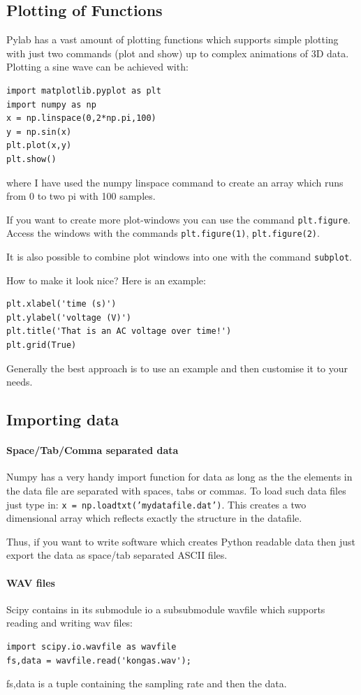 \documentclass[12pt,a4paper]{article}
\begin{document}
\subsection{Plotting of Functions}
Pylab has a vast amount of plotting functions which supports simple plotting
with just two commands (plot and show) up to complex animations of 3D data.
Plotting a sine wave can be achieved with:
\begin{verbatim} 
import matplotlib.pyplot as plt
import numpy as np
x = np.linspace(0,2*np.pi,100)
y = np.sin(x)
plt.plot(x,y)
plt.show()
\end{verbatim}
where I have used the numpy linspace command to create an array which
runs from 0 to two pi with 100 samples.

If you want to create more plot-windows you can use the command
\texttt{plt.figure}. Access the windows with the commands \texttt{plt.figure(1)},
\texttt{plt.figure(2)}.

It is also possible to combine plot windows into one with the
command \texttt{subplot}.

How to make it look nice? Here is an example:
\begin{verbatim}
plt.xlabel('time (s)')
plt.ylabel('voltage (V)')
plt.title('That is an AC voltage over time!')
plt.grid(True)
\end{verbatim}

Generally the best approach is to use an example and then customise it to your needs.




\subsection{Importing data}

\paragraph{Space/Tab/Comma separated data}
Numpy has a very handy import function for data as long as the the
elements in the data file are separated with spaces, tabs or
commas. To load such data files just type in: \texttt{x =
  np.loadtxt('mydatafile.dat')}. This creates a two dimensional array
which reflects exactly the structure in the datafile.

Thus, if you want to write software which creates Python
readable data then just export the data as space/tab separated ASCII files.



\paragraph{WAV files}
Scipy contains in its submodule io a subsubmodule wavfile which supports
reading and writing wav files:
\begin{verbatim}
import scipy.io.wavfile as wavfile
fs,data = wavfile.read('kongas.wav');
\end{verbatim}
fs,data is a tuple containing the sampling rate and then the data.
\end{document}
